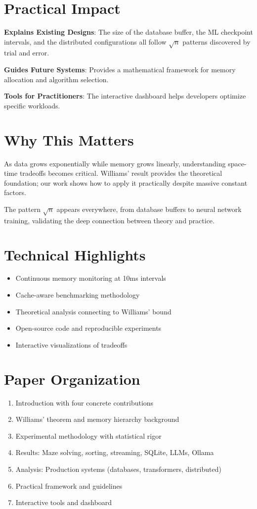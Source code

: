\documentclass[11pt,twocolumn]{article}
\begin{document}
\section{Practical Impact}

\textbf{Explains Existing Designs}: The size of the database buffer, the ML checkpoint intervals, and the distributed configurations all follow $\sqrt{n}$ patterns discovered by trial and error.

\textbf{Guides Future Systems}: Provides a mathematical framework for memory allocation and algorithm selection.

\textbf{Tools for Practitioners}: The interactive dashboard helps developers optimize specific workloads.

\section{Why This Matters}

As data grows exponentially while memory grows linearly, understanding space-time tradeoffs becomes critical. Williams' result provides the theoretical foundation; our work shows how to apply it practically despite massive constant factors.

The pattern $\sqrt{n}$ appears everywhere, from database buffers to neural network training, validating the deep connection between theory and practice.

\section{Technical Highlights}
\begin{itemize}
\item Continuous memory monitoring at 10ms intervals
\item Cache-aware benchmarking methodology  
\item Theoretical analysis connecting to Williams' bound
\item Open-source code and reproducible experiments
\item Interactive visualizations of tradeoffs
\end{itemize}

\section{Paper Organization}
\begin{enumerate}
\item Introduction with four concrete contributions
\item Williams' theorem and memory hierarchy background
\item Experimental methodology with statistical rigor
\item Results: Maze solving, sorting, streaming, SQLite, LLMs, Ollama
\item Analysis: Production systems (databases, transformers, distributed)
\item Practical framework and guidelines
\item Interactive tools and dashboard
\end{enumerate}
\end{document}
